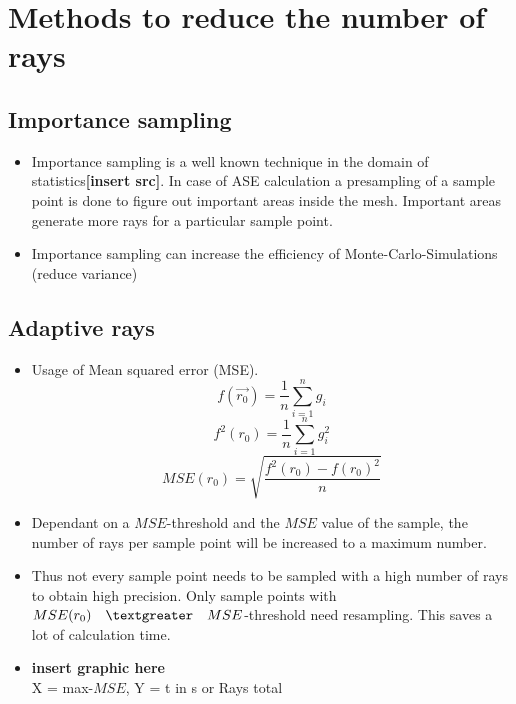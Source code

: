 \section{Methods to reduce the number of rays}

\subsection{Importance sampling}
\begin{itemize}
\item Importance sampling is a well known technique in the domain
  of statistics\textbf{[insert src]}. In case of ASE calculation a presampling of
  a sample point is done to figure out important areas
  inside the mesh. Important areas generate more rays for a
  particular sample point.
\item Importance sampling can increase the efficiency of Monte-Carlo-Simulations (reduce variance)
\end{itemize}

\subsection{Adaptive rays}
\begin{itemize}
\item Usage of Mean squared error (MSE).
     \[f(\vec{r_0}) = \frac{1}{n} \sum_{i=1}^n g_i \]
     \[f^2(r_0) = \frac{1}{n} \sum_{i=1}^n g_i^2 \]
     \[MSE(r_0) = \sqrt{\frac{f^2(r_0) - f(r_0)^2}{n}}\]
\item Dependant on a $MSE$-threshold and the $MSE$ value
  of the sample, the number of rays per sample point 
  will be increased to a maximum number.
\item Thus not every sample point needs to be sampled
  with a high number of rays to obtain high precision.
  Only sample points with $MSE(r_0) \quad \textgreater \quad MSE$-threshold need
  resampling. This saves a lot of calculation time.
\item \textbf{insert graphic here}\\
  X = max-$MSE$, Y = t in s or Rays total
\end{itemize}
